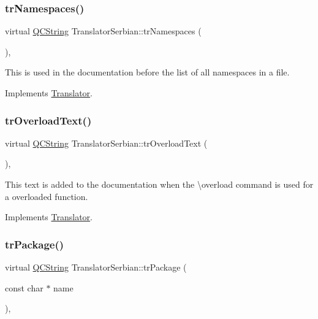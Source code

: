 \subsubsection{\texorpdfstring{trNamespaces()}{trNamespaces()}}
{\footnotesize\ttfamily virtual \mbox{\hyperlink{class_q_c_string}{Q\+C\+String}} Translator\+Serbian\+::tr\+Namespaces (\begin{DoxyParamCaption}{ }\end{DoxyParamCaption})\hspace{0.3cm}{\ttfamily [inline]}, {\ttfamily [virtual]}}

This is used in the documentation before the list of all namespaces in a file. 

Implements \mbox{\hyperlink{class_translator}{Translator}}.

\mbox{\label{class_translator_serbian_ac321d690df8e47fb65dd8ddcaa0fba53}} 
\subsubsection{\texorpdfstring{trOverloadText()}{trOverloadText()}}
{\footnotesize\ttfamily virtual \mbox{\hyperlink{class_q_c_string}{Q\+C\+String}} Translator\+Serbian\+::tr\+Overload\+Text (\begin{DoxyParamCaption}{ }\end{DoxyParamCaption})\hspace{0.3cm}{\ttfamily [inline]}, {\ttfamily [virtual]}}

This text is added to the documentation when the \textbackslash{}overload command is used for a overloaded function. 

Implements \mbox{\hyperlink{class_translator}{Translator}}.

\mbox{\label{class_translator_serbian_a57577ad6fbaf711945aa34a7cd80fa82}} 
\subsubsection{\texorpdfstring{trPackage()}{trPackage()}}
{\footnotesize\ttfamily virtual \mbox{\hyperlink{class_q_c_string}{Q\+C\+String}} Translator\+Serbian\+::tr\+Package (\begin{DoxyParamCaption}\item[{const char $\ast$}]{name }\end{DoxyParamCaption})\hspace{0.3cm}{\ttfamily [inline]}, {\ttfamily [virtual]}}

